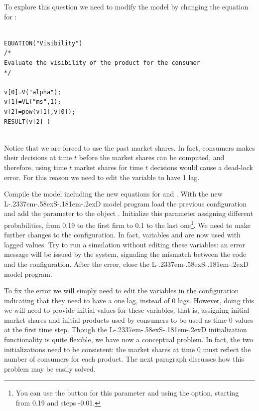 \documentclass [11pt,a4paper] {book}
\def\LsD{{L\kern-.2337em\lower-.58ex\hbox{S}\kern-.181em\lower-.2ex\hbox{D}}\xspace}
\begin{document}
To explore this question we need to modify the model by changing the equation for :

\begin{minipage}[h]{10cm}
\small
\begin{verbatim}

EQUATION("Visibility")
/*
Evaluate the visibility of the product for the consumer
*/

v[0]=V("alpha");
v[1]=VL("ms",1);
v[2]=pow(v[1],v[0]);
RESULT(v[2] )
 
\end{verbatim}
\normalsize
\end{minipage}

Notice that we are forced to use the past market shares. In fact, consumers makes their decisions at time $t$ before the market shares can be computed, and therefore, using time $t$ market shares for time $t$ decisions would cause a dead-lock error. For this reason we need to edit the variable  to have 1 lag. 

Compile the model including the new equations for  and . With the new \LsD model program load the previous configuration and add the parameter  to the object . Initialize this parameter assigning different probabilities, from 0.19 to the first firm to 0.1 to the last one\footnote{You can use the  button for this parameter and using the  option, starting from 0.19 and steps -0.01.}. We need to make further changes to the configuration. In fact, variables  and  are now used with lagged values. Try to run a simulation without editing these variables: an error message will be issued by the system, signaling the mismatch between the code and the configuration. After the error, close the \LsD model program.

To fix the error we will simply need to edit the variables in the configuration indicating that they need to have a one lag, instead of 0 lags. However, doing this we will need to provide initial values for these variables, that is, assigning initial market shares and initial products used by consumers to be used as time 0 values at the first time step. Though the \LsD initialization functionality is quite flexible, we have now a conceptual problem. In fact, the two initializations need to be consistent: the market shares at time 0 must reflect the number of consumers for each product. The next paragraph discusses how this problem may be easily solved.
\end{document}
